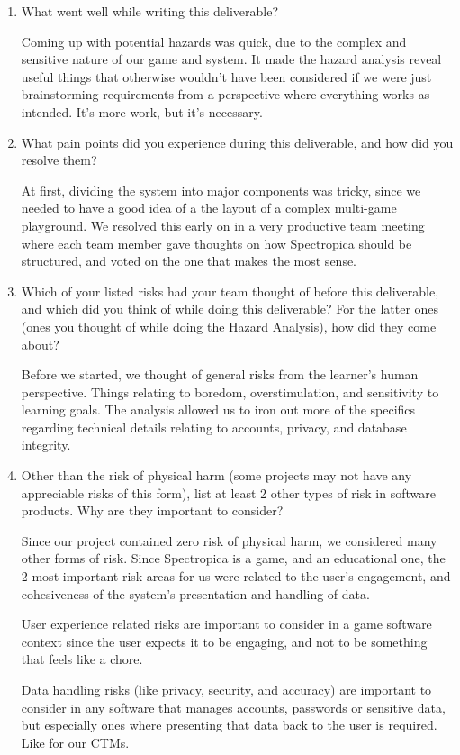 \documentclass{article}
\begin{document}
\begin{enumerate}
    \item What went well while writing this deliverable? 
    
    Coming up with potential hazards was quick, due to the complex and sensitive nature of our game and system. It made the hazard analysis reveal useful things that otherwise wouldn't have been considered if we were just brainstorming requirements from a perspective where everything works as intended. It's more work, but it's necessary.

    \item What pain points did you experience during this deliverable, and how did you resolve them?
    
    At first, dividing the system into major components was tricky, since we needed to have a good idea of a the layout of a complex multi-game playground. We resolved this early on in a very productive team meeting where each team member gave thoughts on how Spectropica should be structured, and voted on the one that makes the most sense.

    \item Which of your listed risks had your team thought of before this deliverable, and which did you think of while doing this deliverable? For the latter ones (ones you thought of while doing the Hazard Analysis), how did they come about?
    
    Before we started, we thought of general risks from the learner's human perspective. Things relating to boredom, overstimulation, and sensitivity to learning goals. The analysis allowed us to iron out more of the specifics regarding technical details relating to accounts, privacy, and database integrity.

    \item Other than the risk of physical harm (some projects may not have any appreciable risks of this form), list at least 2 other types of risk in software products. Why are they important to consider?
    
    Since our project contained zero risk of physical harm, we considered many other forms of risk. Since Spectropica is a game, and an educational one, the 2 most important risk areas for us were related to the user's engagement, and cohesiveness of the system's presentation and handling of data. 

    User experience related risks are important to consider in a game software context since the user expects it to be engaging, and not to be something that feels like a chore. 

    Data handling risks (like privacy, security, and accuracy) are important to consider in any software that manages accounts, passwords or sensitive data, but especially ones where presenting that data back to the user is required. Like for our CTMs.

\end{enumerate}
\end{document}
